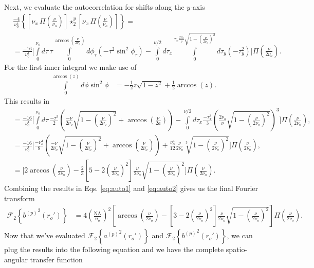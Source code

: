 \documentclass[11pt]{article}
\begin{document}
Next, we evaluate the autocorrelation for shifts along the $y$-axis
\begin{align}
  &\frac{-4}{\nu_0^4}\left\{\left[\nu_x\, \Pi\left(\frac{\nu}{\nu_o}\right)\right] \star_2^y \left[\nu_x\, \Pi\left(\frac{\nu}{\nu_o}\right)\right]\right\} = \\
  &=  \frac{-16}{\nu_o^4}\Bigg[\int\limits_0^{\nu_o} d\tau\, \tau \int\limits_0^{\arccos\left(\frac{\nu}{2\nu_o}\right)}d\phi_{\tau}(-\tau^2\sin^2\phi_{\tau}) - \int\limits_0^{\nu/2}d\tau_x \int\limits_0^{\tau_x \frac{2\nu_o}{\nu}\sqrt{1 - \left(\frac{\nu}{2\nu_o}\right)^2}}d\tau_y(-\tau_y^2)\Bigg]\Pi\left(\frac{\nu}{2\nu_o}\right).
\end{align}
For the first inner integral we make use of
\begin{align}
  \int\limits_0^{\arccos(z)} d\phi \sin^2\phi &= -\frac{1}{2}z\sqrt{1 - z^2} + \frac{1}{2}\arccos(z).
\end{align}
This results in
\begin{align}
  &=\frac{-16}{\nu_o^4}\Bigg[\int\limits_0^{\nu_o} d\tau\, \frac{-\tau^3}{2}\left(\frac{-\nu}{2\nu_o}\sqrt{1 - \left(\frac{\nu}{2\nu_o}\right)^2} + \arccos\left(\frac{\nu}{2a}\right)\right) - \int\limits_0^{\nu/2}d\tau_x \frac{-\tau_x^3}{3}\left(\frac{2 \nu_o}{\nu}\sqrt{1 - \left(\frac{\nu}{2\nu_o}\right)^2}\right)^3\Bigg]\Pi\left(\frac{\nu}{2\nu_o}\right),\\
  &=  \frac{-16}{\nu_o^4}\Bigg[\frac{-\nu_o^4}{8}\left(\frac{-\nu}{2\nu_o}\sqrt{1 - \left(\frac{\nu}{2\nu_o}\right)^2} + \arccos\left(\frac{\nu}{2\nu_o}\right) \right) + \frac{\nu_o^4}{12}\frac{\nu}{2\nu_o}\sqrt[3]{1 - \left(\frac{\nu}{2\nu_o}\right)^2}\Bigg]\Pi\left(\frac{\nu}{2\nu_o}\right),\\
  &=  \Bigg[2\arccos\left(\frac{\nu}{2\nu_o}\right) - \frac{2}{3}\left[5 - 2\left(\frac{\nu}{2\nu_o}\right)^2\right]\frac{\nu}{2\nu_o}\sqrt{1 - \left(\frac{\nu}{2\nu_o}\right)^2}\Bigg]\Pi\left(\frac{\nu}{2\nu_o}\right). \label{eq:auto2}
\end{align}
Combining the results in Eqs. \ref{eq:auto1} and \ref{eq:auto2} gives us the final Fourier transform
\begin{align}
    \mathcal{F}_2\left\{{b^{(p)}}^2(r_o')\right\} &= 4\left(\frac{\text{NA}}{n_o}\right)^2\left[\arccos\left(\frac{\nu}{2\nu_o}\right) - \left[3 - 2\left(\frac{\nu}{2\nu_o}\right)^2\right]\frac{\nu}{2\nu_o} \sqrt{1 - \left(\frac{\nu}{2\nu_o}\right)^2}\right]\Pi\left(\frac{\nu}{2\nu_o}\right).
\end{align}
Now that we've evaluated $\mathcal{F}_2\left\{{a^{(p)}}^2(r_o')\right\}$ and $\mathcal{F}_2\left\{{b^{(p)}}^2(r_o')\right\}$, we can plug the results into the following equation and we have the complete spatio-angular transfer function
\end{document}
